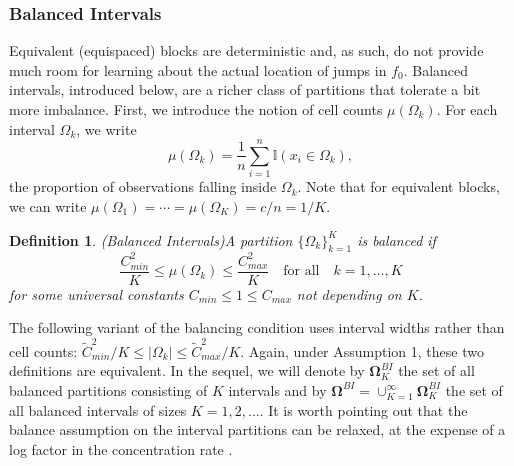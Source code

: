 \documentclass{article}
\newcommand{\1}{\mathbb{I}}
\newcommand{\bm}[1]{\boldsymbol{#1}}
\newtheorem{definition}{Definition}[section]
\theoremstyle{assumption}
\begin{document}
\subsubsection{Balanced Intervals}\label{sec:balance}
Equivalent (equispaced) blocks are deterministic and, as such, do not provide much room for learning about the actual location of  jumps in $f_0$. Balanced intervals, introduced below, are a richer class of partitions that tolerate a bit more imbalance.
First, we introduce the notion of  cell counts $\mu(\Omega_k)$.  For each interval $\Omega_k$, we write
\vspace{-0.1cm}
\begin{equation}\label{cell:count}
\mu(\Omega_k)=\frac{1}{n}\sum_{i=1}^n\mathbb{I}(x_i\in\Omega_k),
\end{equation}
the proportion of observations falling inside $\Omega_k$.  
Note that for equivalent blocks, we can write $\mu(\Omega_1)=\cdots=\mu(\Omega_K)=c/n=1/K$.
\begin{definition}(Balanced Intervals)\label{ass:balance}
A partition $\{\Omega_k\}_{k=1}^K$ is {\sl balanced} if
\begin{equation}\label{eq:balance}
\frac{C^2_{min}}{K}\leq \mu(\Omega_k)\leq \frac{C^2_{max}}{K} \quad\text{for all}\quad k=1,\dots, K 
\end{equation}
 for some universal constants $C_{min}\leq 1\leq C_{max}$ not depending on $K$.
\end{definition}
The following variant of the balancing condition uses interval widths rather than cell counts:
${\widetilde{C}^2_{min}}/{K}\leq |\Omega_k|\leq {\widetilde{C}^2_{max}}/{K}$.  Again, under Assumption 1, these two definitions are equivalent. In the sequel, we will denote by $\bm{\Omega}^{BI}_K$ the set of all balanced  partitions consisting of $K$ intervals and by $\bm{\Omega}^{BI}=\cup_{K=1}^\infty\bm{\Omega}^{BI}_K$ the set of all balanced intervals of sizes $K=1,2,\dots$. 
It is worth pointing out that the balance assumption on the interval partitions can  be relaxed, at the expense of a log factor in the concentration rate \cite{Rockova2017}.

\end{document}
